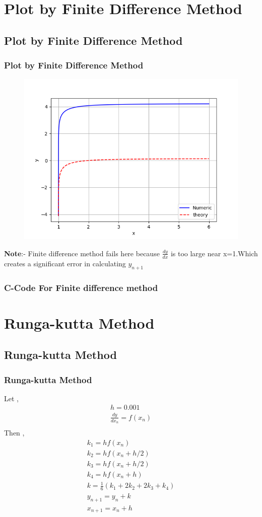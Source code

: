 \documentclass{beamer}
\providecommand{\brak}[1]{\ensuremath{\left(#1\right)}}
\theoremstyle{remark}
\numberwithin{equation}{section}
\begin{document}
\section{Plot by Finite Difference Method}
\subsection{Plot by Finite Difference Method}
\begin{frame}
\frametitle{Plot by Finite Difference Method}


\begin{figure}[h!]
   \centering
   \includegraphics[width=0.7\linewidth]{figs/Figure_2.png}
   \label{Graph by Finite difference Method}
\end{figure}
\textbf{Note}:- Finite difference method fails here because $\frac{dy}{dx}$ is too large near x=1.Which creates a significant error in calculating $y_{n+1}$
\end{frame}
\begin{frame}
\frametitle{C-Code For Finite difference method}


\end{frame}

\section{Runga-kutta Method}
\subsection{Runga-kutta Method}
\begin{frame}
\frametitle{Runga-kutta Method}

Let ,
\begin{align} 
	h=0.001 \\
	\frac{dy}{dx_n} = f\brak{x_n} \\
\end{align}
Then ,
\begin{align} 
	k_1 = hf\brak{x_n}\\
	k_2 = hf\brak{x_n + h/2}\\
	k_3 = hf\brak{x_n + h/2}\\
	k_4 = hf\brak{x_n + h}\\
	k = \frac{1}{6}\brak{k_1 + 2k_2 + 2k_3+k_4}\\
	y_{n+1} = y_n + k\\
	x_{n+1} = x_{n} + h 
\end{align}
\end{frame}
\end{document}
